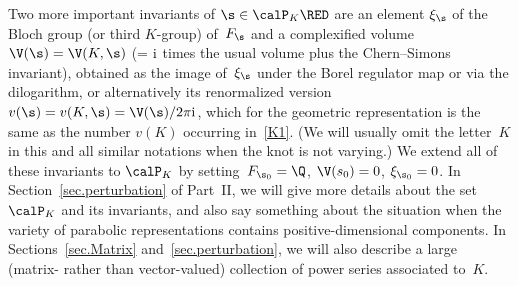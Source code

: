 Two more important invariants of $\s\in\calP_K\RED$ are an element $\xi_\s$
of the Bloch group (or third $K$-group) of~$F_\s$ and a complexified
volume $\V(\s)=\V(K,\s)$ (= ${\rm i}$ times the usual volume plus the Chern--Simons
invariant), obtained as the image of~$\xi_\s$ under the Borel regulator
map or via the dilogarithm, or alternatively its renormalized version
$v(\s)=v(K,\s)=\V(\s)/2\pi {\rm i}$, which for the geometric representation is
the same as the number $v(K)$ occurring in~\eqref{K1}.
(We will usually omit the letter~$K$ in this and all similar notations when
the knot is not varying.) We extend all of these invariants to $\calP_K$
by setting~$F_{\s_0}=\Q$, $\V(s_0)=0$, $\xi_{\s_0}=0$.
In Section~\ref{sec.perturbation} of Part~II,
we will give more details about the set $\calP_K$ and its invariants, and
also say something about the situation when the variety of parabolic
representations contains positive-dimensional components. In
Sections~\ref{sec.Matrix} and~\ref{sec.perturbation}, we will also describe
a large (matrix- rather than vector-valued) collection of power series
associated to~$K$.
